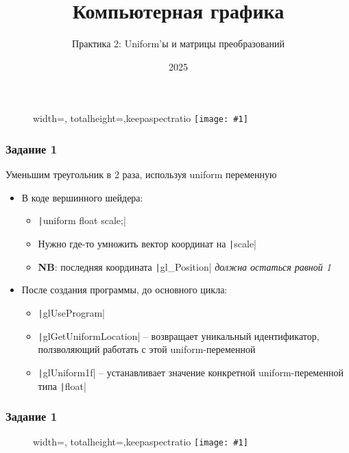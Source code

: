 \documentclass[10pt]{beamer}
\title{Компьютерная графика}
\subtitle{Практика 2: Uniform'ы и матрицы преобразований}
\date{2025}
\newcommand{\slideimage}[1]{
  \begin{figure}
    \begin{adjustbox}{width=\textwidth, totalheight=\textheight-2\baselineskip-2\baselineskip,keepaspectratio}
      \texttt{[image: \#1]}
    \end{adjustbox}
  \end{figure}
}
\begin{document}
\frame{\titlepage}

\begin{frame}
\slideimage{0.png}
\end{frame}

\begin{frame}[fragile]
\frametitle{Задание 1}
Уменьшим треугольник в 2 раза, используя uniform переменную
\begin{itemize}
\item В коде вершинного шейдера:
\begin{itemize}
\item \texttt|uniform float scale;|
\item Нужно где-то умножить вектор координат на \texttt|scale|
\item \textbf{\alert{NB}}: последняя координата \texttt|gl_Position| \textit{должна остаться равной 1}
\end{itemize}
\item После создания программы, до основного цикла:
\begin{itemize}
\item \texttt|glUseProgram|
\item \texttt|glGetUniformLocation| -- возвращает уникальный идентификатор, ползволяющий работать с этой uniform-переменной
\item \texttt|glUniform1f| -- устанавливает значение конкретной uniform-переменной типа \texttt|float|
\end{itemize}
\end{itemize}
\end{frame}

\begin{frame}
\frametitle{Задание 1}
\slideimage{1.png}
\end{frame}
\end{document}
